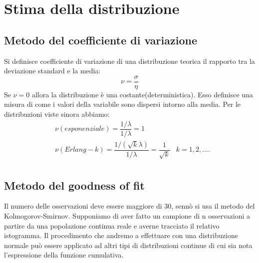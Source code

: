\section{Stima della distribuzione}
\subsection{Metodo del coefficiente di variazione}
Si definisce coefficiente di variazione di una distribuzione teorica il rapporto tra la deviazione standard e la media:
\[ \nu  = \dfrac{\sigma}{\eta}\]
Se $\nu=0$ allora la distribuzione è una costante(deterministica).
Esso definisce una misura di come i valori della variabile sono dispersi intorno alla media. Per le distribuzioni viste sinora abbiamo:
\begin{align*}
    & \nu(esponenziale) = \dfrac{1/\lambda}{1/\lambda} =1\\
    & \nu(Erlang-k) = \dfrac{1/(\sqrt{k}\lambda)}{1/\lambda} = \dfrac{1}{\sqrt{k}} & k=1,2,....\\
\end{align*}
\subsection{Metodo del goodness of fit}
Il numero delle osservazioni deve essere maggiore di 30, sennò si usa il metodo del Kolmogorov-Smirnov. Supponiamo di aver fatto un campione di n osservazioni a partire da una popolazione continua reale e averne tracciato il relativo istogramma. Il procedimento che andremo a effettuare con una distribuzione normale può essere applicato ad altri tipi di distribuzioni continue di cui sia nota l'espressione della funzione cumulativa.

